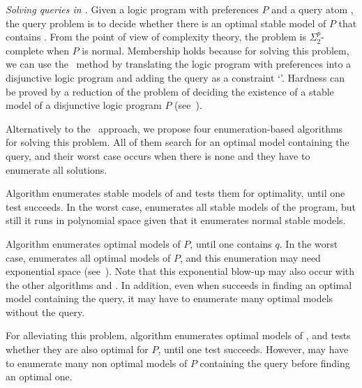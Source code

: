 
\emph{Solving queries in \asprin.}
%
Given a logic program with preferences $P$ and a query atom , 
the query problem is to decide whether there is an optimal stable model of $P$ that contains .
%
From the point of view of complexity theory, the problem is $\Sigma^p_2$-complete when $P$ is normal.
%
Membership holds because for solving this problem, 
we can use the \gc\ method by
translating the logic program with preferences into a disjunctive logic program
and adding the query as a constraint `'.
%
Hardness can be proved by a reduction of the problem of deciding 
the existence of a stable model of a disjunctive logic program $P$ (see~\cite{roscwa16b}). %

%
Alternatively to the \gc\ approach, we propose four enumeration-based algorithms for solving this problem.
%
All of them search for an optimal model containing the query, 
and their worst case occurs when there is none 
and they have to enumerate all solutions.

Algorithm  enumerates stable models of  and 
tests them for optimality, until one test succeeds.
%
In the worst case,  enumerates all stable models of the program, 
but still it runs in polynomial space given that it enumerates normal stable models.

Algorithm  enumerates optimal models of $P$, until one contains $q$.
%
In the worst case,  enumerates all optimal models of $P$, 
and this enumeration may need exponential space (see~\cite{brderosc15a}).
%
Note that this exponential blow-up may also occur with the other algorithms  and .
%
In addition, even when  succeeds in finding an optimal model containing the query, 
it may have to enumerate many optimal models without the query. %

For alleviating this problem, algorithm  enumerates optimal models of 
, 
and tests whether they are also optimal for $P$, until one test succeeds.
%
However,  may have to enumerate many non optimal models of $P$ containing the query
before finding an optimal one.

